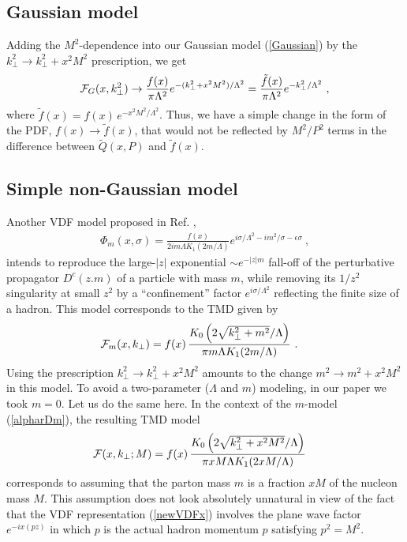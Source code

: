 \documentclass[final,5p,times,twocolumn]{elsarticle}
\begin{document}
\subsection{Gaussian model} 


  Adding the  $M^2$-dependence into  our Gaussian model 
(\ref{Gaussian})  by the $k_\perp^2 \to k_\perp^2 + x^2 M^2 $ prescription, we get 
  \begin{align}
{\cal F} _G (x, k_\perp^2) \to  \frac{f (x)}{\pi \Lambda^2}  e^{-(k_\perp^2+x^2 M^2)/\Lambda^2}
=  \frac{\tilde f (x)}{\pi \Lambda^2}  e^{-k_\perp^2/\Lambda^2} \ , 
\label{Gaussian2}
\end{align} 
where $\tilde f (x) = f(x)\, e^{- x^2 M^2/\Lambda^2}$.  Thus,  
we have a 
 simple change in the form of the PDF, $f(x) \to \tilde f(x)$,  that would not be reflected 
by  $M^2/P^2$  terms  in the difference between $\tilde Q(x, P)$ and $\tilde f(x)$.






\subsection{Simple non-Gaussian model} 

Another VDF model proposed in Ref. \cite{Radyushkin:2016hsy}, 
\begin{align} 
\Phi_m  (x, \sigma) = \frac{f(x)}{ 2i {m}{\Lambda} K_1 (2 m/ \Lambda) } e^{i \sigma /\Lambda^2  - i  m^2 /\sigma -\epsilon \sigma }  \ , 
\label{alpharDm}
\end{align}
intends to reproduce the large-$|z|$  exponential $\sim e^{-|z| m}$ fall-off  of the  perturbative 
propagator $D^c (z.m)$ of a particle with mass $m$,  while removing its  $1/z^2$ singularity 
at small $z^2$  by a ``confinement'' factor $ e^{i \sigma /\Lambda^2}$ reflecting
the  finite size of a  hadron.  
This model 
corresponds to  the  TMD  given by 
\begin{align}
& {\cal F}_m(x, k_\perp ) = f (x)\,  \frac{K_0 \left (2 \sqrt{ k_\perp^2 +m^2 } / \Lambda \right ) }{ \pi  m \Lambda
 K_1 (2 m/ \Lambda) }  \  . 
 \label{psim}
\end{align}
Using the prescription $k_\perp^2 \to k_\perp^2 + x^2 M^2$ amounts to the change
$m^2 \to m^2 + x^2 M^2$   in this model.  To avoid a two-parameter ($\Lambda$ and $m$)  
modeling,  in our paper  \cite{Radyushkin:2016hsy}  we took $m=0$.
Let us do the same here. In the context of the $m$-model (\ref{alpharDm}), 
the resulting TMD model 
\begin{align}
& {\cal F} (x, k_\perp; M ) = f (x)\,  \frac{K_0 \left (2 \sqrt{ k_\perp^2 +x^2 M^2} / \Lambda \right ) }{ \pi  xM  \Lambda
 K_1 (2 xM / \Lambda) }  
 \label{psixM}
\end{align}
 corresponds to assuming that the parton mass
$m$ is a fraction $xM$ of the nucleon mass $M$. 
This assumption does not look   absolutely  unnatural in view of the fact 
that the VDF representation (\ref{newVDFx}) involves  the plane wave factor
$e^{-ix (pz)}$  in which $p$ is the {actual}  hadron  momentum $p$ satisfying
$p^2=M^2$. 
\end{document}
